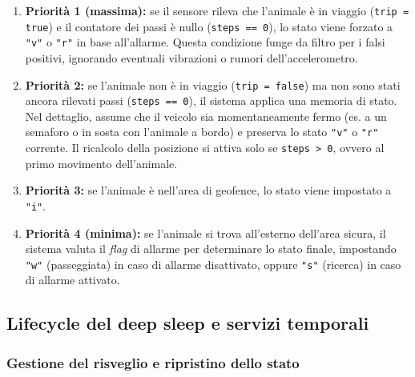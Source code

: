 \documentclass[12pt,a4paper]{article}
\begin{document}
\begin{enumerate}
    \item \textbf{Priorità 1 (massima):} se il sensore rileva che l'animale è in viaggio (\texttt{trip = true}) e il contatore dei passi è nullo (\texttt{steps == 0}), lo stato viene forzato a \texttt{"v"} o \texttt{"r"} in base all'allarme. Questa condizione funge da filtro per i falsi positivi, ignorando eventuali vibrazioni o rumori dell'accelerometro.
    \item \textbf{Priorità 2:} se l'animale non è in viaggio (\texttt{trip = false}) ma non sono stati ancora rilevati passi (\texttt{steps == 0}), il sistema applica una memoria di stato. Nel dettaglio, assume che il veicolo sia momentaneamente fermo (es. a un semaforo o in sosta con l'animale a bordo) e preserva lo stato \texttt{"v"} o \texttt{"r"} corrente. Il ricalcolo della posizione si attiva solo se \texttt{steps > 0}, ovvero al primo movimento dell'animale.
    \item \textbf{Priorità 3:} se l'animale è nell'area di geofence, lo stato viene impostato a \texttt{"i"}.
    \item \textbf{Priorità 4 (minima):} se l'animale si trova all'esterno dell'area sicura, il sistema valuta il \textit{flag} di allarme per determinare lo stato finale, impostando \texttt{"w"} (passeggiata) in caso di allarme disattivato, oppure \texttt{"s"} (ricerca) in caso di allarme attivato.
\end{enumerate}

\subsection{Lifecycle del deep sleep e servizi temporali}

\subsubsection{Gestione del risveglio e ripristino dello stato}
\end{document}

